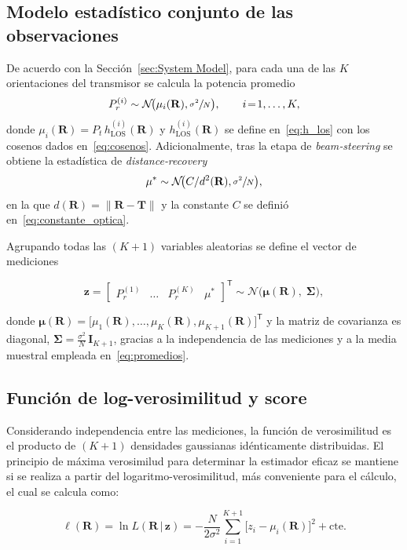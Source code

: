 \documentclass[lettersize,journal]{IEEEtran}
\begin{document}
\subsection{Modelo estadístico conjunto de las observaciones}

De acuerdo con la Sección~\ref{sec:System Model}, para cada una de las $K$ orientaciones del transmisor se calcula la potencia promedio
\[
P_r^{(i)} \sim \mathcal N\!\bigl(\mu_i(\mathbf R),\sfrac{\sigma^2}{N}\bigr), 
\qquad i\!=\!1,\dots,K,
\]
donde 
\(
\mu_i(\mathbf R)=P_t \, h_{\mathrm{LOS}}^{(i)}(\mathbf R)
\)
y $h_{\mathrm{LOS}}^{(i)}(\mathbf R)$ se define en~\eqref{eq:h_los} con los cosenos dados en~\eqref{eq:cosenos}.  
Adicionalmente, tras la etapa de \emph{beam‑steering} se obtiene la estadística de \emph{distance‑recovery}
\[
\mu^{*}\sim\mathcal N\!\bigl(C/d^{2}(\mathbf R),\sfrac{\sigma^2}{N}\bigr),
\]
en la que $d(\mathbf R)=\lVert\mathbf R-\mathbf T\rVert$ y la constante $C$ se definió en~\eqref{eq:constante_optica}.  

Agrupando todas las $(K+1)$ variables aleatorias se define el vector de mediciones

\[
\mathbf z
=
\begin{bmatrix}
P_r^{(1)} & \!\dots & P_r^{(K)} & \mu^{*}
\end{bmatrix}^{\!\mathsf T}
\sim 
\mathcal N\!\bigl(\boldsymbol\mu(\mathbf R),\;\mathbf\Sigma\bigr),
\]

donde 
\(
\boldsymbol\mu(\mathbf R)=
\bigl[\mu_1(\mathbf R),\dots,\mu_K(\mathbf R),\mu_{K+1}(\mathbf R)\bigr]^{\mathsf T}
\)
y la matriz de covarianza es diagonal, $\mathbf\Sigma=\frac{\sigma^2}{N}\,\mathbf I_{K+1}$, gracias a la independencia de las mediciones y a la media muestral empleada en~\eqref{eq:promedios}.

\subsection{Función de log-verosimilitud y score}
Considerando independencia entre las mediciones, la función de verosimilitud es el producto de $(K+1)$ densidades gaussianas idénticamente distribuidas. El principio de máxima verosimilud para determinar la estimador eficaz se mantiene si se realiza a partir del logaritmo-verosimilitud, más conveniente para el cálculo, el cual se calcula como:

\begin{equation}
\ell(\mathbf R) = \ln L(\mathbf R\,|\,\mathbf z) = -\frac{N}{2\sigma^{2}}\sum_{i=1}^{K+1}\bigl[z_i-\mu_i(\mathbf R)\bigr]^2+\text{cte}.
\label{eq:loglike}
\end{equation}
\end{document}
